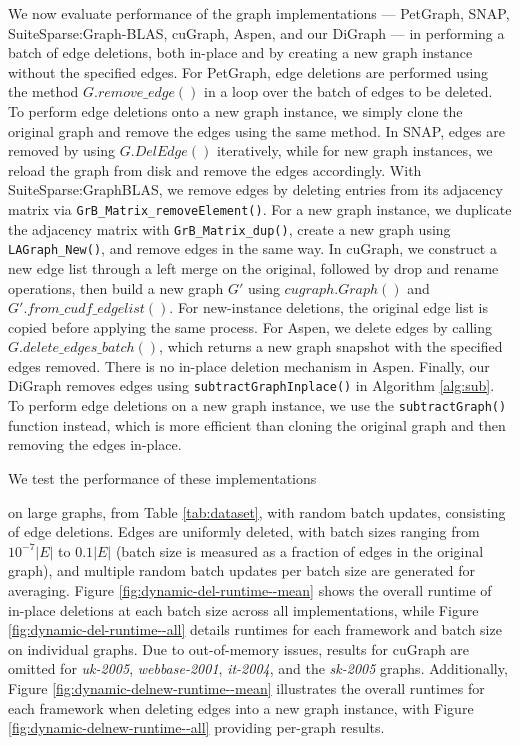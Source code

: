 We now evaluate performance of the graph implementations --- PetGraph, SNAP, SuiteSparse:Graph-BLAS, cuGraph, Aspen, and our DiGraph --- in performing a batch of edge deletions, both in-place and by creating a new graph instance without the specified edges. For PetGraph, edge deletions are performed using the method $G.remove\_edge()$ in a loop over the batch of edges to be deleted. To perform edge deletions onto a new graph instance, we simply clone the original graph and remove the edges using the same method. In SNAP, edges are removed by using $G.DelEdge()$ iteratively, while for new graph instances, we reload the graph from disk and remove the edges accordingly. With SuiteSparse:GraphBLAS, we remove edges by deleting entries from its adjacency matrix via \texttt{GrB\_Matrix\_removeElement()}. For a new graph instance, we duplicate the adjacency matrix with \texttt{GrB\_Matrix\_dup()}, create a new graph using \texttt{LAGraph\_New()}, and remove edges in the same way. In cuGraph, we construct a new edge list through a left merge on the original, followed by drop and rename operations, then build a new graph $G'$ using $cugraph.Graph()$ and $G'.from\_cudf\_edgelist()$. For new-instance deletions, the original edge list is copied before applying the same process. For Aspen, we delete edges by calling $G.delete\_edges\_batch()$, which returns a new graph snapshot with the specified edges removed. There is no in-place deletion mechanism in Aspen. Finally, our DiGraph removes edges using \texttt{subtractGraphInplace()} in Algorithm \ref{alg:sub}. To perform edge deletions on a new graph instance, we use the \texttt{subtractGraph()} function instead, which is more efficient than cloning the original graph and then removing the edges in-place.



We test the performance of these implementations on large graphs, from Table \ref{tab:dataset}, with random batch updates, consisting of edge deletions. Edges are uniformly deleted, with batch sizes ranging from $10^{-7} |E|$ to $0.1|E|$ (batch size is measured as a fraction of edges in the original graph), and multiple random batch updates per batch size are generated for averaging. Figure \ref{fig:dynamic-del-runtime--mean} shows the overall runtime of in-place deletions at each batch size across all implementations, while Figure \ref{fig:dynamic-del-runtime--all} details runtimes for each framework and batch size on individual graphs. Due to out-of-memory issues, results for cuGraph are omitted for \textit{uk-2005}, \textit{webbase-2001}, \textit{it-2004}, and the \textit{sk-2005} graphs. Additionally, Figure \ref{fig:dynamic-delnew-runtime--mean} illustrates the overall runtimes for each framework when deleting edges into a new graph instance, with Figure \ref{fig:dynamic-delnew-runtime--all} providing per-graph results.


